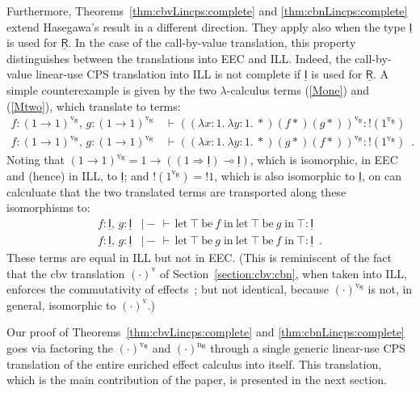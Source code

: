 \documentclass{LMCS}
\newcommand{\comptype}[1]{\underline{#1}}
\newcommand{\CR}{\comptype{\mathsf{R}}}
\newcommand{\CI}{\comptype{\mathsf{I}}}
\newcommand{\Vone}{1}
\newcommand{\Vfun}{\to}
\newcommand{\lpop}{\multimap}
\newcommand{\Cfun}{\Rightarrow}
\newcommand{\Cbang}[1]{{! #1}}
\newcommand{\In}[2]{#1 \colon  \! #2}
\newcommand{\rIn}[2]{#1 \colon  #2}
\newcommand{\Cj}[4]{#1 \mid  \! #2 \, \vdash \, \rIn{#3}{#4}}
\newcommand{\Vj}[3]{\Cj{#1}{{-}}{#2}{#3}}
\newcommand{\Itop}{\top}
\newcommand{\Ilet}[2]{\mathrm{let}\: {\Itop}\:\mathrm{be}\:{#1} \;\mathrm{in}\: #2}
\newcommand{\Lone}{1}
\newcommand{\Lfun}{\to}
\newcommand{\Lj}[3]{#1  \, \vdash  \rIn{#2}{#3}}
\newcommand{\Lstar}{*}
\newcommand{\Llam}[3]{\lambda \In{#1}{#2}.\: #3}
\newcommand{\Lappl}[2]{#1  #2}
\newcommand{\cbv}[1]{#1^{\mathrm{v}}}
\newcommand{\cbvLincps}[1]{#1^{\mathrm{v_{\CR}}}}
\newcommand{\cbnLincps}[1]{#1^{\mathrm{n_{\CR}}}}
\begin{document}
Furthermore, Theorems~\ref{thm:cbvLincps:complete} and \ref{thm:cbnLincps:complete} extend Hasegawa's
result in a different direction. They apply also when the type $\CI$ is used for $\CR$. 
In the case of the call-by-value translation, this property distinguishes
between the translations into EEC and ILL. Indeed, the call-by-value linear-use CPS
translation into ILL is not complete if $\CI$ is used for $\CR$. A simple counterexample
is given by the two $\lambda$-calculus terms (\ref{Mone}) and (\ref{Mtwo}),
which translate to terms:
\begin{align*}
\Lj{\In{f}{\cbvLincps{(\Lone \Lfun \Lone)}},\, \In{g}{\cbvLincps{(\Lone \Lfun \Lone)}} & }
{\cbvLincps{(\Lappl{\Lappl{(\Llam{x}{\Lone}{\Llam{y}{\Lone}{\Lstar}})}{(\Lappl{f}{\Lstar})}}{(\Lappl{g}{\Lstar})})}}
{\Cbang{(\cbvLincps{\Lone})}}
\\
\Lj{\In{f}{\cbvLincps{(\Lone \Lfun \Lone)}},\, \In{g}{\cbvLincps{(\Lone \Lfun \Lone)}} & }
{\cbvLincps{(\Lappl{\Lappl{(\Llam{x}{\Lone}{\Llam{y}{\Lone}{\Lstar}})}{(\Lappl{g}{\Lstar})}}{(\Lappl{f}{\Lstar})})}}
{\Cbang{(\cbvLincps{\Lone})}} \enspace .
\end{align*}
Noting that $\cbvLincps{(\Lone \Lfun \Lone)} = \Vone \Vfun ((\Vone \Cfun \CI) \lpop \CI)$,
which is isomorphic,
in EEC and (hence) in ILL, to $\CI$;
and $\Cbang{(\cbvLincps{\Lone})} = \Cbang{\Vone}$, which is also isomorphic to $\CI$, on can calculuate
that the two translated terms are transported along these isomorphisms to:
\begin{align*}
\Vj{\In{f}{\CI},\, \In{g}{\CI} & }{\Ilet{f}{\Ilet{g}{\Itop}}}{\CI}
\\
\Vj{\In{f}{\CI},\, \In{g}{\CI} & }{\Ilet{g}{\Ilet{f}{\Itop}}}{\CI} \enspace .
\end{align*}
These terms are equal in ILL but not in EEC. (This is reminiscent of the fact that the
cbv translation $\cbv{(\cdot)}$  of Section~\ref{section:cbv:cbn}, when taken into ILL,
enforces the commutativity of effects~\cite{BW:96}; but not identical, because 
$\cbvLincps{(\cdot)}$ is not, in general, isomorphic to $\cbv{(\cdot)}$.)





Our proof of Theorems~\ref{thm:cbvLincps:complete} and \ref{thm:cbnLincps:complete}
goes via factoring the $\cbvLincps{(\cdot)}$ and $\cbnLincps{(\cdot)}$ through a 
single generic linear-use CPS translation of the entire
enriched effect calculus into itself. This translation, which is the main contribution 
of the paper,  is presented in the next section.
\end{document}

